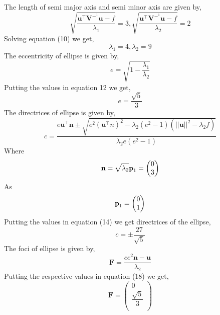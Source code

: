 \documentclass[twocolumn]{article}
\begin{document}
The length of semi major axis and semi minor axis are given by,
\begin{equation}
\sqrt{\frac{\textbf{u}^\top \textbf{V}^-^1 \textbf{u} - f}{ \lambda_1}} = 3   ,   \sqrt{\frac{\textbf{u}^\top \textbf{V}^-^1 \textbf{u} - f}{ \lambda_2}} = 2
 \end{equation}
Solving equation (10) we get,
\begin{equation}
\lambda_1 = 4   ,   \lambda_2 = 9
\end{equation}
The eccentricity of ellipse is given by,
\begin{equation}
e = \sqrt{1 - \frac{\lambda_1}{\lambda_2}}
\end{equation}
Putting the values in equation 12 we get,
\begin{equation}
e = \frac{\sqrt{5}}{3}
\end{equation}
The directrices of ellipse is given by,
\begin{equation}
c = \frac{e \textbf{u}^\top \textbf{n} \pm \sqrt{e^2 (\textbf{u}^\top n)^2 - \lambda_2 (e^2 - 1) (||\textbf{u}||^2 - \lambda_2 f)}}{\lambda_2 e (e^2 - 1)}
\end{equation}
Where
\begin{equation}
\textbf{n} = \sqrt{\lambda_2} \textbf p_1 = \begin{pmatrix}
0\\
3\\
\end{pmatrix}
\end{equation}As
\begin{equation}
 \textbf p_1 = \begin{pmatrix}
0\\
1\\
\end{pmatrix}
\end{equation}
Putting the values in equation (14) we get directrices of the ellipse,
\begin{equation}
c = \pm \frac{27}{\sqrt{5}}
\end{equation}
The foci of ellipse is given by,
\begin{equation}
\textbf{F} = \frac{c e^2 \textbf{n} - \textbf{u}}{\lambda_2}
\end{equation}
Putting the respective values in equation (18) we get,
\begin{equation}
\textbf{F} = \begin{pmatrix}
0\\
\dfrac{\sqrt{5}}{3}\\
\end{pmatrix}
\end{equation}
\end{document}
